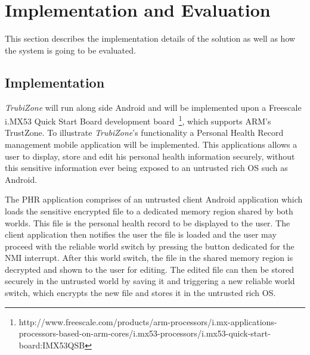 
% 
% 
\section{Implementation and Evaluation}
\label{sec:evaluation}

This section describes the implementation details of the solution as well as how the system is going to be evaluated.

\subsection{Implementation}

\emph{TrubiZone} will run along side Android and will be implemented upon a Freescale i.MX53 Quick Start Board development board~\footnote{http://www.freescale.com/products/arm-processors/i.mx-applications-processors-based-on-arm-cores/i.mx53-processors/i.mx53-quick-start-board:IMX53QSB}, which supports ARM's TrustZone. To illustrate \emph{TrubiZone}'s functionality a Personal Health Record management mobile application will be implemented. This applications allows a user to display, store and edit his personal health information securely, without this sensitive information ever being exposed to an untrusted rich OS such as Android.

The \ac{PHR} application comprises of an untrusted client Android application which loads the sensitive encrypted file to a dedicated memory region shared by both worlds. This file is the personal health record to be displayed to the user. The client application then notifies the user the file is loaded and the user may proceed with the reliable world switch by pressing the button dedicated for the \ac{NMI} interrupt. After this world switch, the file in the shared memory region is decrypted and shown to the user for editing. The edited file can then be stored securely in the untrusted world by saving it and triggering a new reliable world switch, which encrypts the new file and stores it in the untrusted rich OS.



